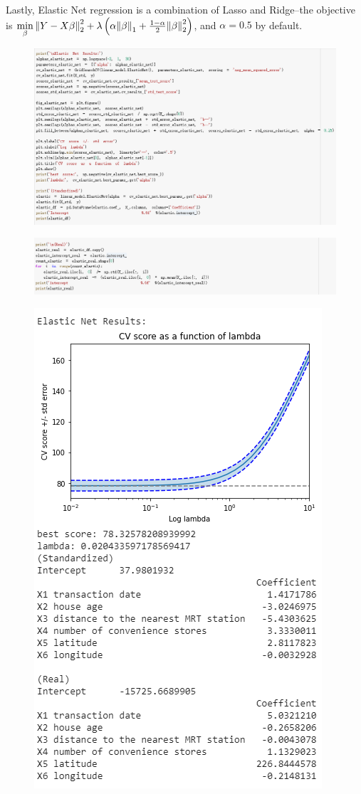 \documentclass{article}
\begin{document}
Lastly, Elastic Net regression is a combination of Lasso and Ridge--the objective is $\min\limits_{\beta} \norm{Y - X\beta}^2_2 + \lambda \left(\alpha \norm{\beta}_1 + \frac{1 - \alpha}{2} \norm{\beta}^2_2\right)$, and $\alpha = 0.5$ by default.
\begin{figure}[H]\includegraphics[width=1.1\linewidth]{46.1}\end{figure}
\begin{figure}[H]\includegraphics[width=1.1\linewidth]{46.2}\end{figure}
\begin{figure}[H]\includegraphics[width=0.6\linewidth]{47}\end{figure}
\end{document}
